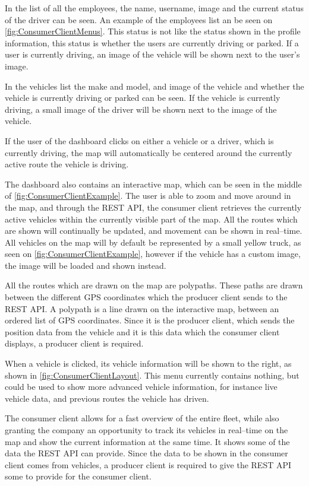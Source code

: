 In the list of all the employees, the name, username, image and the current status of the driver can be seen.
An example of the employees list an be seen on \cref{fig:ConsumerClientMenus}.
This status is not like the status shown in the profile information, this status is whether the users are currently driving or parked.
If a user is currently driving, an image of the vehicle will be shown next to the user's image.

In the vehicles list the make and model, and image of the vehicle and whether the vehicle is currently driving or parked can be seen.
If the vehicle is currently driving, a small image of the driver will be shown next to the image of the vehicle.

If the user of the dashboard clicks on either a vehicle or a driver, which is currently driving, the map will automatically be centered around the currently active route the vehicle is driving.

\bigskip
The dashboard also contains an interactive map, which can be seen in the middle of \cref{fig:ConsumerClientExample}.
The user is able to zoom and move around in the map, and through the REST API, the consumer client retrieves the currently active vehicles within the currently visible part of the map.
All the routes which are shown will continually be updated, and movement can be shown in real--time.
All vehicles on the map will by default be represented by a small yellow truck, as seen on \cref{fig:ConsumerClientExample}, however if the vehicle has a custom image, the image will be loaded and shown instead.

All the routes which are drawn on the map are polypaths. 
These paths are drawn between the different GPS coordinates which the producer client sends to the REST API.
A polypath is a line drawn on the interactive map, between an ordered list of GPS coordinates.
Since it is the producer client, which sends the position data from the vehicle and it is this data which the consumer client displays,
a producer client is required.

When a vehicle is clicked, its vehicle information will be shown to the right, as shown in \cref{fig:ConsumerClientLayout}. 
This menu currently contains nothing, but could be used to show more advanced vehicle information, for instance live vehicle data, and previous routes the vehicle has driven.

\bigskip
The consumer client allows for a fast overview of the entire fleet, while also granting the company an opportunity to track its vehicles in real--time on the map and show the current information at the same time.
It shows some of the data the REST API can provide.
Since the data to be shown in the consumer client comes from vehicles, a producer client is required to give the REST API some to provide for the consumer client.
